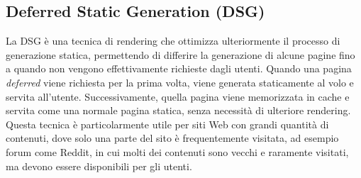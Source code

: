 \subsection{Deferred Static Generation (DSG)}
La DSG è una tecnica di rendering che ottimizza ulteriormente il processo
di generazione statica, permettendo di differire la generazione di alcune pagine fino a quando non vengono
effettivamente richieste dagli utenti. 
Quando una pagina \emph{deferred} viene richiesta per la prima volta, viene generata staticamente al volo e servita all'utente. Successivamente, quella pagina viene memorizzata in cache e servita come una normale pagina statica, senza necessità di ulteriore rendering.\\
Questa tecnica è particolarmente utile per siti Web con grandi quantità di contenuti, dove solo una parte del sito è frequentemente visitata, ad esempio forum come Reddit, in cui molti dei contenuti sono vecchi e raramente visitati, ma devono essere disponibili per gli utenti.


